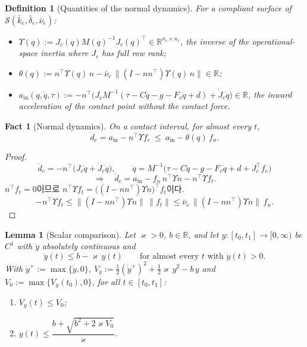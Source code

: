 \documentclass[11pt]{article}\usepackage[margin=1in]{geometry}\usepackage{amsmath,amssymb,amsthm,mathtools}\usepackage{graphicx}\graphicspath{{figures/}{../figures/}{figs/}{./}}\usepackage{enumitem}\usepackage{hyperref}\usepackage{cleveref}\usepackage{tikz}\usetikzlibrary{arrows.meta,positioning,calc,shapes.geometric}\usepackage{float}\usepackage{rotating}\usepackage[most]{tcolorbox}\usepackage{kotex}\usepackage{booktabs}\usepackage{longtable}\emergencystretch=1.6em\tolerance=2000 \crefname{assumption}{Assumption}{Assumptions}\Crefname{assumption}{Assumption}{Assumptions}\crefname{definition}{Definition}{Definitions}\Crefname{definition}{Definition}{Definitions}\crefname{proposition}{Proposition}{Propositions}\Crefname{proposition}{Proposition}{Propositions}\crefname{fact}{Fact}{Facts}\Crefname{fact}{Fact}{Facts} \newtheorem{assumption}{Assumption}\newtheorem{definition}{Definition}\newtheorem{lemma}{Lemma}\newtheorem{proposition}{Proposition}\newtheorem{theorem}{Theorem}\newtheorem{corollary}{Corollary}\newtheorem{fact}{Fact}\theoremstyle{remark}\newtheorem{remark}{Remark} \newcommand{\R}{\mathbb{R}}\newcommand{\xb}{\bar x}\newcommand{\Ab}{\bar A}\newcommand{\By}{\bar B_y}\newcommand{\U}{\mathcal U}\newcommand{\Z}{\mathcal Z}
\begin{document}
\begin{definition}[Quantities of the normal dynamics]
\label{def:normal}
For a compliant surface of $\mathcal S(\bar k_e,\bar\delta_e,\bar\nu_e)$:
\begin{itemize}
\item $\Upsilon(q):=J_c(q)M(q)^{-1}J_c(q)^\top\in\R^{n_c\times n_c}$, the inverse of the operational-space inertia where $J_c$ has full row rank;
\item $\theta(q):=n^\top\Upsilon(q)\,n-\bar\nu_e\,\|(I-nn^\top)\Upsilon(q)\,n\|\in\R$;
\item $a_{\mathrm{in}}(q,\dot q,\tau):=-n^\top\big(J_cM^{-1}(\tau-C\dot q-g-F_v\dot q+d)+\dot J_c\dot q\big)\in\R$, the inward acceleration of the contact point without the contact force.
\end{itemize}
\end{definition}

\begin{fact}[Normal dynamics]
\label{fact:normal}
On a contact interval, for almost every $t$,
\[
\ddot d_c=a_{\mathrm{in}}-n^\top\Upsilon f_e\ \le\ a_{\mathrm{in}}-\theta(q)\,f_n .
\]
\end{fact}

\begin{proof}
\[
\ddot d_c=-n^\top\big(J_c\ddot q+\dot J_c\dot q\big),\qquad \ddot q=M^{-1}\big(\tau-C\dot q-g-F_v\dot q+d+J_c^\top f_e\big)
\]
\[
\Longrightarrow\quad \ddot d_c=a_{\mathrm{in}}-f_n\,n^\top\Upsilon n-n^\top\Upsilon f_t .
\]
$n^\top f_t=0$이므로 $n^\top\Upsilon f_t=\big((I-nn^\top)\Upsilon n\big)^\top f_t$이다.
\[
-n^\top\Upsilon f_t\le\|(I-nn^\top)\Upsilon n\|\,\|f_t\|\le\bar\nu_e\,\|(I-nn^\top)\Upsilon n\|\,f_n .
\]
\end{proof}

\begin{lemma}[Scalar comparison]
\label{lem:scalar}
Let $\varkappa>0$, $b\in\R$, and let $y:[t_0,t_1]\to[0,\infty)$ be $C^1$ with $\dot y$ absolutely continuous and
\[
\ddot y(t)\le b-\varkappa\,y(t)\qquad\text{for almost every $t$ with }\dot y(t)>0 .
\]
With $\dot y^+:=\max\{\dot y,0\}$, $V_y:=\tfrac12(\dot y^+)^2+\tfrac12\varkappa\,y^2-b\,y$ and $V_0:=\max\{V_y(t_0),0\}$, for all $t\in[t_0,t_1]$:
\begin{enumerate}[label=(\alph*)]
\item $V_y(t)\le V_0$;
\item $y(t)\le\dfrac{b+\sqrt{b^2+2\varkappa V_0}}{\varkappa}$.
\end{enumerate}
\end{lemma}
\end{document}
